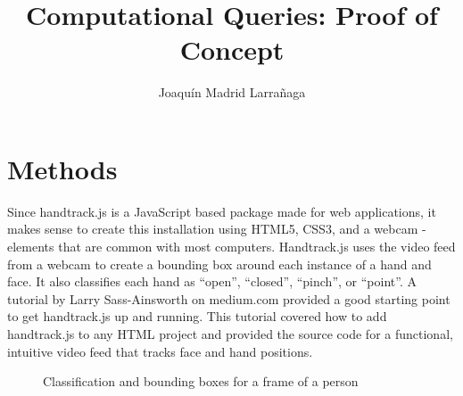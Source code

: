 \documentclass[10pt,twocolumn]{article}
\title{Computational Queries: Proof of Concept}
\author{Joaquín Madrid Larrañaga}
\affiliation{Occidental College}
\begin{document}
\maketitle

\section{Methods}
Since handtrack.js \cite{noauthor_handtrackjs_nodate-1} is a JavaScript based package made for web applications, it makes sense to create this installation using HTML5, CSS3, and a webcam - elements that are common with most computers.   Handtrack.js uses the video feed from a webcam to create a bounding box around each instance of a hand and face.  It also classifies each hand as ``open'', ``closed'', ``pinch'', or ``point''.  A tutorial by Larry Sass-Ainsworth on medium.com \cite{sass-ainsworth_getting_2019} provided a good starting point to get handtrack.js up and running.  This tutorial covered how to add handtrack.js to any HTML project and provided the source code for a functional, intuitive video feed that tracks face and hand positions. 

\begin{figure}[hbh]
\begin{center}
\vspace{.5cm}
\caption{Classification and bounding boxes for a frame of a person}
\label{fig:bounding_boxes}
\end{center}
\end{figure}
\end{document}
